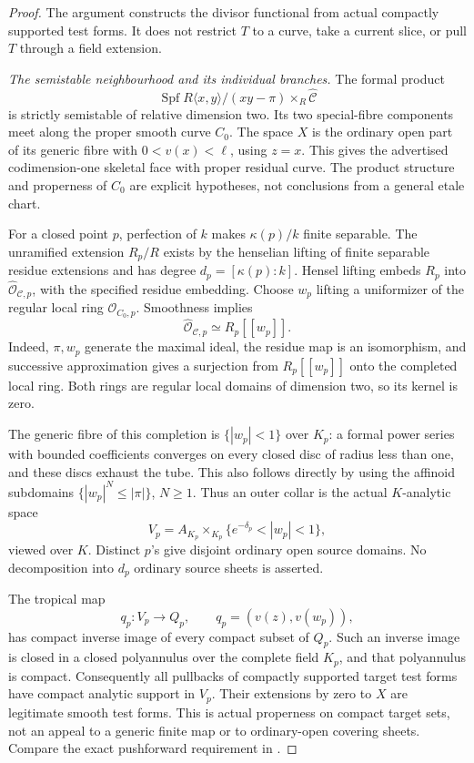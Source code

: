 \begin{proof}
The argument constructs the divisor functional from actual
compactly supported test forms. It does not restrict \(T\) to a
curve, take a current slice, or pull \(T\) through a field extension.

\emph{The semistable neighbourhood and its individual branches.}
The formal product
\[
 \operatorname{Spf}R\langle x,y\rangle/(xy-\pi)
       \times_R\widehat{\mathcal C}
\]
is strictly semistable of relative dimension two. Its two
special-fibre components meet along the proper smooth curve
\(C_0\). The space \(X\) is the ordinary open part of its generic
fibre with \(0<v(x)<\ell\), using \(z=x\). This gives the
advertised codimension-one skeletal face with proper residual
curve. The product structure and properness of \(C_0\) are
explicit hypotheses, not conclusions from a general etale chart.

For a closed point \(p\), perfection of \(k\) makes
\(\kappa(p)/k\) finite separable. The unramified extension \(R_p/R\)
exists by the henselian lifting of finite separable residue
extensions and has degree \(d_p=[\kappa(p):k]\).
Hensel lifting embeds \(R_p\) into
\(\widehat{\mathcal O}_{\mathcal C,p}\), with the specified residue
embedding. Choose \(w_p\) lifting a uniformizer of the regular
local ring \(\mathcal O_{C_0,p}\). Smoothness implies
\[
 \widehat{\mathcal O}_{\mathcal C,p}\simeq R_p[[w_p]].
\]
Indeed, \(\pi,w_p\) generate the maximal ideal, the residue map is
an isomorphism, and successive approximation gives a surjection
from \(R_p[[w_p]]\) onto the completed local ring. Both rings are
regular local domains of dimension two, so its kernel is zero.

The generic fibre of this completion is
\(\{|w_p|<1\}\) over \(K_p\): a formal power series with bounded
coefficients converges on every closed disc of radius less than
one, and these discs exhaust the tube. This also follows directly
by using the affinoid subdomains
\(\{|w_p|^N\leq|\pi|\}\), \(N\geq1\).
Thus an outer collar is the actual \(K\)-analytic space
\[
 V_p=A_{K_p}\times_{K_p}
        \{e^{-\delta_p}<|w_p|<1\},
\]
viewed over \(K\). Distinct \(p\)'s give disjoint ordinary open
source domains. No decomposition into \(d_p\) ordinary source
sheets is asserted.

The tropical map
\[
 q_p:V_p\longrightarrow Q_p,\qquad
        q_p=(v(z),v(w_p)),
\]
has compact inverse image of every compact subset of \(Q_p\).
Such an inverse image is closed in a closed polyannulus over
the complete field \(K_p\), and that polyannulus is compact.
Consequently all pullbacks of compactly supported target test
forms have compact analytic support in \(V_p\). Their extensions
by zero to \(X\) are legitimate smooth test forms. This is actual
properness on compact target sets, not an appeal to a generic
finite map or to ordinary-open covering sheets.
Compare the exact pushforward requirement in
\cite[Section 7.1.11, p.~159]{CLD25}.


\end{proof}
